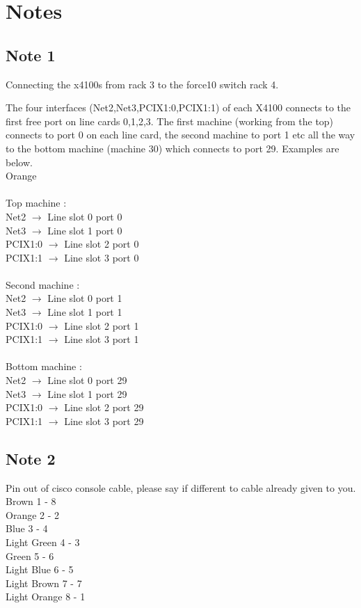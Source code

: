 \documentclass[a4paper]{article}
\begin{document}
\newpage

\section{Notes}
\subsection{Note 1}

Connecting the x4100s from rack 3 to the force10 switch rack 4.

The four interfaces (Net2,Net3,PCIX1:0,PCIX1:1) of each X4100 connects
to the first free port on line cards 0,1,2,3. The first machine
(working from the top) connects to port 0 on each line card, the
second machine to port 1 etc all the way to the bottom machine
(machine 30) which connects to port 29. Examples are below. 
\\
Orange\\
\\
Top machine :\\
Net2 $\rightarrow$ Line slot 0 port 0\\
Net3 $\rightarrow$ Line slot 1 port 0\\
PCIX1:0 $\rightarrow$ Line slot 2 port 0\\
PCIX1:1 $\rightarrow$ Line slot 3 port 0\\
\\
Second machine :\\
Net2 $\rightarrow$ Line slot 0 port 1\\
Net3 $\rightarrow$ Line slot 1 port 1\\
PCIX1:0 $\rightarrow$ Line slot 2 port 1\\
PCIX1:1 $\rightarrow$ Line slot 3 port 1\\
\\
Bottom machine :\\
Net2 $\rightarrow$ Line slot 0 port 29\\
Net3 $\rightarrow$ Line slot 1 port 29\\
PCIX1:0 $\rightarrow$ Line slot 2 port 29\\
PCIX1:1 $\rightarrow$ Line slot 3 port 29\\

\subsection{Note 2}


Pin out of cisco console cable, please say if different to cable
already given to you.
\\
Brown 1 - 8 \\
Orange 2 - 2\\
Blue 3 - 4\\
Light Green 4 - 3\\
Green 5 - 6\\
Light Blue 6 - 5\\
Light Brown 7 - 7\\
Light Orange 8 - 1\\
\\
\end{document}
